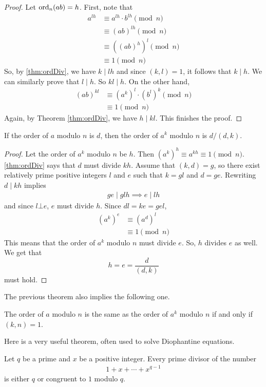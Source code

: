 \documentclass{subfile}
\begin{document}
	\begin{proof}
		Let $\operatorname{ord}_n(ab)=h$. First, note that
			\begin{align*}
				a^{lh}
					& \equiv a^{lh}\cdot b^{lh}\pmod{n}\\
					& \equiv (ab)^{lh}\pmod{n}\\
					& \equiv \left((ab)^h\right)^l\pmod{n}\\
					& \equiv 1 \pmod n
			\end{align*}
		So, by \autoref{thm:ordDiv}, we have $k\mid lh$ and since $(k,l)=1$, it follows that $k\mid h$. We can similarly prove that $l\mid h$. So $kl\mid h$. On the other hand,
			\begin{align*}
				(ab)^{kl}
					& \equiv (a^k)^l \cdot (b^l)^k\pmod{n}\\
					& \equiv 1 \pmod n
			\end{align*}
		Again, by Theorem \eqref{thm:ordDiv}, we have $h\mid kl$. This finishes the proof.
	\end{proof}

	\begin{theorem}
		If the order of $a$ modulo $n$ is $d$, then the order of $a^k$ modulo $n$ is $d/{(d,k)}$.
	\end{theorem}

	\begin{proof}
		Let the order of $a^k$ modulo $n$ be $h$. Then $\left(a^k\right)^h \equiv a^{kh} \equiv 1\pmod n$. \autoref{thm:ordDiv} says that $d$ must divide $kh$. Assume that $(k,d)=g$, so there exist relatively prime positive integers $l$ and $e$ such that $k=gl$ and $d=ge$. Rewriting $d \mid  kh$ implies
			\begin{align*}
				ge\mid glh \implies e\mid lh
			\end{align*}
		and since $l\bot e$, $e$ must divide $h$. Since $dl=ke=gel$,
			\begin{align*}
				\left(a^k\right)^{e}
					& \equiv \left(a^d\right)^{l}\\
					& \equiv 1\pmod n
			\end{align*}
		This means that the order of $a^k$ modulo $n$ must divide $e$. So, $h$ divides $e$ as well. We get that $$h=e=\dfrac{d}{(d,k)}$$ must hold.
	\end{proof}
The previous theorem also implies the following one.
	\begin{theorem}
		The order of $a$ modulo $n$ is the same as the order of $a^k$ modulo $n$ if and only if $(k,n)=1$.
	\end{theorem}
Here is a very useful theorem, often used to solve Diophantine equations.
	\begin{theorem}\label{thm:cyclodiv}
		Let $q$ be a prime and $x$ be a positive integer. Every prime divisor of the number
			\begin{align*}
				1+x+\cdots+x^{q-1}
			\end{align*}
		is either $q$ or congruent to $1$ modulo $q$.
	\end{theorem}
\end{document}
